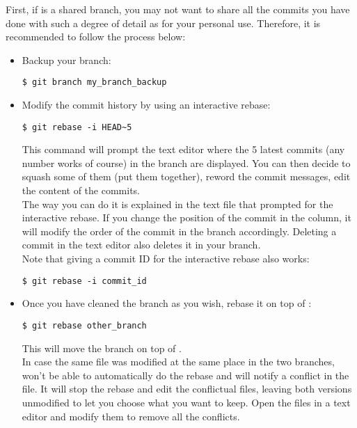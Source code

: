 First, if  is a shared branch, you may not want to
share all the commits you have done with such a degree of detail as for your
personal use.
Therefore, it is recommended to follow the process below:
\begin{itemize}
\item Backup your branch:
\begin{lstlisting}
$ git branch my_branch_backup
\end{lstlisting}

\item Modify the commit history by using an interactive rebase:
\begin{lstlisting}
$ git rebase -i HEAD~5
\end{lstlisting}
This command will prompt the text editor where the 5 latest commits (any number
works of course) in the branch are displayed. You can then decide to squash
some of them (put them together), reword the commit messages, edit the content
of the commits.\\

The way you can do it is explained in the text file that  prompted
for the interactive rebase. If you change the position of the commit in the
column, it will modify the order of the commit in the branch accordingly.
Deleting a commit in the text editor also deletes it in your branch.\\

Note that giving a commit ID for the interactive rebase also works:
\begin{lstlisting}
$ git rebase -i commit_id
\end{lstlisting}

\item Once you have cleaned the branch as you wish, rebase it on top of
:
\begin{lstlisting}
$ git rebase other_branch
\end{lstlisting}
This will move the branch  on top of
.\\

In case the same file was modified at the same place in the two branches,
 won't be able to automatically do the rebase and will notify a
conflict in the file. It will stop the rebase and edit the conflictual files,
leaving both versions unmodified to let you choose what you want to keep.
Open the files in a text editor and modify them to remove all the conflicts.
\\


\end{itemize}
